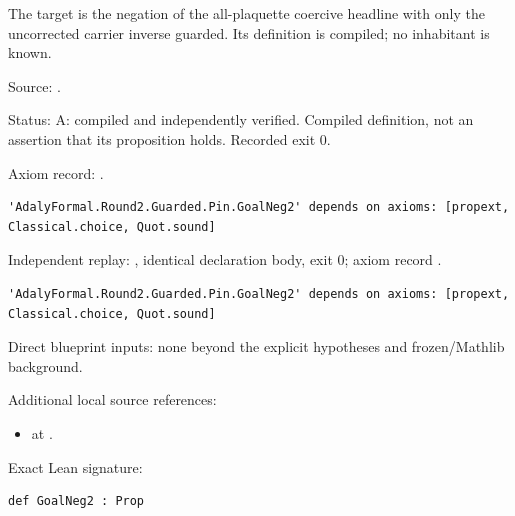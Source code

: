 \begin{definition}[bp-001]
\label{bp-001}
\uses{}
\leanok
The target is the negation of the all-plaquette coercive headline with only the uncorrected carrier inverse guarded. Its definition is compiled; no inhabitant is known.

\par Source: \texttt{}.
\par Status: A: compiled and independently verified. Compiled definition, not an assertion that its proposition holds. Recorded exit 0.
\par Axiom record: \texttt{}.
\begin{verbatim}
'AdalyFormal.Round2.Guarded.Pin.GoalNeg2' depends on axioms: [propext, Classical.choice, Quot.sound]
\end{verbatim}
\par Independent replay: \texttt{}, identical declaration body, exit 0; axiom record \texttt{}.
\begin{verbatim}
'AdalyFormal.Round2.Guarded.Pin.GoalNeg2' depends on axioms: [propext, Classical.choice, Quot.sound]
\end{verbatim}
\par Direct blueprint inputs: none beyond the explicit hypotheses and frozen/Mathlib background.
\par Additional local source references:
\begin{itemize}
\item \texttt{} at \texttt{}.
\end{itemize}
\par Exact Lean signature:
\begin{verbatim}
def GoalNeg2 : Prop
\end{verbatim}
\end{definition}

